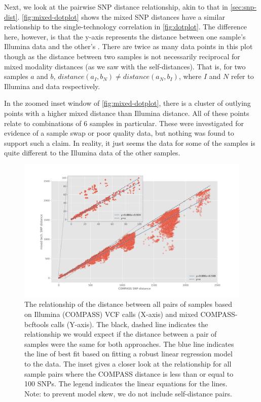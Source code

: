 Next, we look at the pairwise SNP distance relationship, akin to that in \autoref{sec:snp-dist}. \autoref{fig:mixed-dotplot} shows the mixed SNP distances have a similar relationship to the single-technology correlation in \autoref{fig:dotplot}. The difference here, however, is that the y-axis represents the distance between one sample's Illumina data and the other's \ont{}. There are twice as many data points in this plot though as the distance between two samples is not necessarily reciprocal for mixed modality distances (as we saw with the self-distances). That is, for two samples $a$ and $b$, $distance(a_I,b_N) \neq distance(a_N, b_I)$, where $I$ and $N$ refer to Illumina and \ont{} data respectively. 

In the zoomed inset window of \autoref{fig:mixed-dotplot}, there is a cluster of outlying points with a higher mixed distance than Illumina distance. All of these points relate to combinations of 6 samples in particular. These were investigated for evidence of a sample swap or poor quality data, but nothing was found to support such a claim. In reality, it just seems the \ont{} data for some of the samples is quite different to the Illumina data of the other samples.

\begin{figure}
\begin{center}
\includegraphics[width=0.90\columnwidth]{Chapter2/Figs/mixed-dotplot.png}
\caption{{The relationship of the distance between all pairs of samples based on Illumina (COMPASS) VCF calls (X-axis) and mixed COMPASS-bcftools calls (Y-axis). The black, dashed line indicates the relationship we would expect if the distance between a pair of samples were the same for both approaches. The blue line indicates the line of best fit based on fitting a robust linear regression model to the data. The inset gives a closer look at the relationship for all sample pairs where the COMPASS distance is less than or equal to 100 SNPs. The legend indicates the linear equations for the lines. Note: to prevent model skew, we do not include self-distance pairs.
{\label{fig:mixed-dotplot}}
}}
\end{center}
\end{figure}

